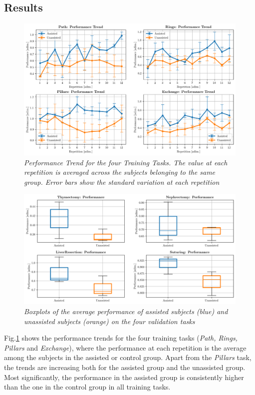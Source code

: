 \documentclass{article}
\begin{document}
\begin{multicols}{2}
\section{Results}
\begin{figure}
  \centering
      \includegraphics[width=\linewidth]{images/performance_training.png}
      \caption{\small{\textit{
        Performance Trend for the four Training Tasks. The value at each repetition is averaged across the subjects belonging to the same group. Error bars show the standard variation at each repetition
      }}}
      \label{fig:performancetraining}
\end{figure}
\begin{figure}
  \centering
      \includegraphics[width=\linewidth]{images/performance_validation.png}
      \caption{\small{\textit{
        Boxplots of the average performance of assisted subjects (blue) and unassisted subjects (orange) on the four validation tasks
      }}}
      \label{fig:performancevalidation}
\end{figure}
Fig.\ref{fig:performancetraining} shows the performance trends for the four training tasks (\textit{Path, Rings, Pillars} and \textit{Exchange}), where the performance at each repetition is the average among the subjects in the assisted or control group. Apart from the \textit{Pillars} task, the trends are increasing both for the assisted group and the unassisted group. Most significantly, the performance in the assisted group is consistently higher than the one in the control group in all training tasks. 

\end{multicols}
\end{document}
